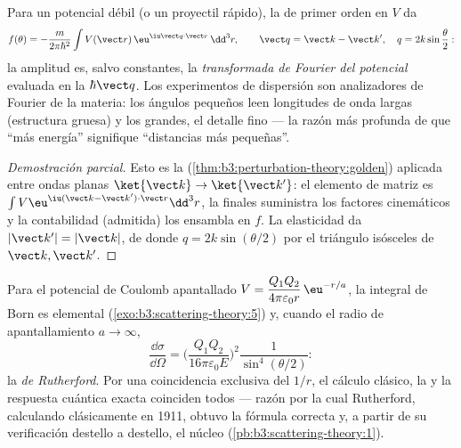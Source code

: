 \begin{theorem}\label{thm:b3:scattering-theory:born}
Para un potencial débil (o un proyectil rápido), la  de primer orden en $V$ da
\[
f(\theta) = -\frac{m}{2\pi\hbar^2}
\int V(\vect r)\,\eu^{\iu\vect q\cdot\vect r}\,\dd^3r ,
\qquad
\vect q = \vect k - \vect k' , \quad
q = 2k\sin\frac\theta2 :
\]
la amplitud es, salvo constantes, la \emph{transformada de Fourier del
potencial} evaluada en la  $\hbar\vect q$.
Los experimentos de dispersión son analizadores de Fourier de la materia:
los ángulos pequeños leen longitudes de onda largas (estructura gruesa) y
los grandes, el detalle fino --- la razón más profunda de que ``más energía''
signifique ``distancias más pequeñas''.
\end{theorem}

\begin{proof}[Demostración parcial]
Esto es la 
(\cref{thm:b3:perturbation-theory:golden}) aplicada entre ondas planas
$\ket{\vect k} \to \ket{\vect k'}$: el elemento de matriz es
$\int V\eu^{\iu(\vect k - \vect k')\cdot\vect r}\dd^3r$, la
 finales suministra los factores cinemáticos y la
contabilidad (admitida) los ensambla en $f$. La elasticidad da
$|\vect k'| = |\vect k|$, de donde $q = 2k\sin(\theta/2)$ por el
triángulo isósceles de $\vect k, \vect k'$.
\end{proof}

\begin{example}\label{ex:b3:scattering-theory:rutherford}
Para el potencial de Coulomb apantallado $V = \dfrac{Q_1Q_2}{4\pi
\varepsilon_0 r}\,\eu^{-r/a}$, la integral de Born es elemental
(\cref{exo:b3:scattering-theory:5}) y, cuando el radio de apantallamiento
$a \to \infty$,
\[
\frac{\dd\sigma}{\dd\Omega} =
\Big(\frac{Q_1Q_2}{16\pi\varepsilon_0 E}\Big)^2
\frac{1}{\sin^4(\theta/2)} :
\]
la \emph{ de Rutherford}. Por una coincidencia exclusiva del
$1/r$, el cálculo clásico, la  y la respuesta cuántica
exacta coinciden todos --- razón por la cual Rutherford, calculando
clásicamente en 1911, obtuvo la fórmula correcta y, a partir de su
verificación destello a destello, el núcleo
(\cref{pb:b3:scattering-theory:1}).
\end{example}

